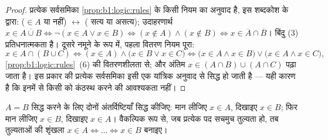 \begin{proof}
प्रत्येक सर्वसमिका \cref{prop:b1:logic:rules} के किसी नियम का अनुवाद है, इस
शब्दकोश के द्वारा: ($\in A$ या नहीं) $\leftrightarrow$ ( सत्य या असत्य);
उदाहरणार्थ $x \in \overline{A \cup B} \iff \lnot(x \in A \lor x \in B) \iff
(x \notin A) \land (x \notin B) \iff x \in \overline{A} \cap \overline{B}$।
बिंदु (3) प्रतिधनात्मकता है। दूसरे नमूने के रूप में, पहला वितरण नियम पूरा:
\[
x \in A \cap (B \cup C)
\iff (x \in A) \land \bigl(x \in B \lor x \in C\bigr)
\iff \bigl(x \in A \land x \in B\bigr) \lor
\bigl(x \in A \land x \in C\bigr),
\]
\cref{prop:b1:logic:rules}~(6) की वितरणशीलता से; और अंतिम  $x \in (A \cap
B) \cup (A \cap C)$ पढ़ा जाता है। इस प्रकार की प्रत्येक  सर्वसमिका
इसी एक यांत्रिक अनुवाद से सिद्ध हो जाती है --- यही कारण है कि इनमें से किसी
को कंठस्थ करने की आवश्यकता नहीं।
\end{proof}

\begin{method}\label{met:b1:logic:doubleinc}
$A = B$ सिद्ध करने के लिए दोनों अंतर्विष्टियाँ सिद्ध कीजिए: मान लीजिए $x \in
A$, दिखाइए $x \in B$; फिर मान लीजिए $x \in B$, दिखाइए $x \in A$। वैकल्पिक
रूप से, जब प्रत्येक पद सचमुच तुल्यता हो, तब तुल्यताओं की शृंखला $x \in A
\iff \dots \iff x \in B$ बनाइए।
\end{method}


